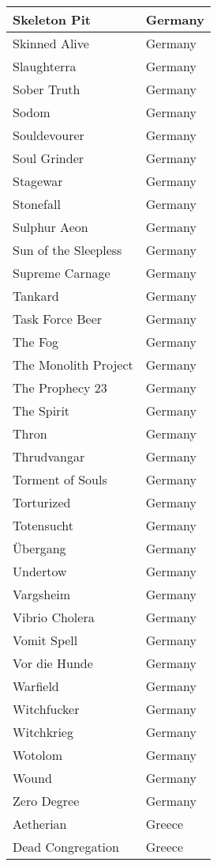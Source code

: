 \documentclass[12pt, a4paper, twoside]{report}
\begin{document}
\begin{center}
\begin{longtable}{|p{5cm}|p{5cm}|}
Skeleton Pit & Germany \\ \hline
Skinned Alive & Germany \\ \hline
Slaughterra & Germany \\ \hline
Sober Truth & Germany \\ \hline
Sodom & Germany \\ \hline
Souldevourer & Germany \\ \hline
Soul Grinder & Germany \\ \hline
Stagewar & Germany \\ \hline
Stonefall & Germany \\ \hline
Sulphur Aeon & Germany \\ \hline
Sun of the Sleepless & Germany \\ \hline
Supreme Carnage & Germany \\ \hline
Tankard & Germany \\ \hline
Task Force Beer & Germany \\ \hline
The Fog & Germany \\ \hline
The Monolith Project & Germany \\ \hline
The Prophecy 23 & Germany \\ \hline
The Spirit & Germany \\ \hline
Thron & Germany \\ \hline
Thrudvangar & Germany \\ \hline
Torment of Souls & Germany \\ \hline
Torturized & Germany \\ \hline
Totensucht & Germany \\ \hline
Übergang & Germany \\ \hline
Undertow & Germany \\ \hline
Vargsheim & Germany \\ \hline
Vibrio Cholera & Germany \\ \hline
Vomit Spell & Germany \\ \hline
Vor die Hunde & Germany \\ \hline
Warfield & Germany \\ \hline
Witchfucker & Germany \\ \hline
Witchkrieg & Germany \\ \hline
Wotolom & Germany \\ \hline
Wound & Germany \\ \hline
Zero Degree & Germany \\ \hline
Aetherian & Greece \\ \hline
Dead Congregation & Greece \\ \hline

\end{longtable}
\end{center}
\end{document}
